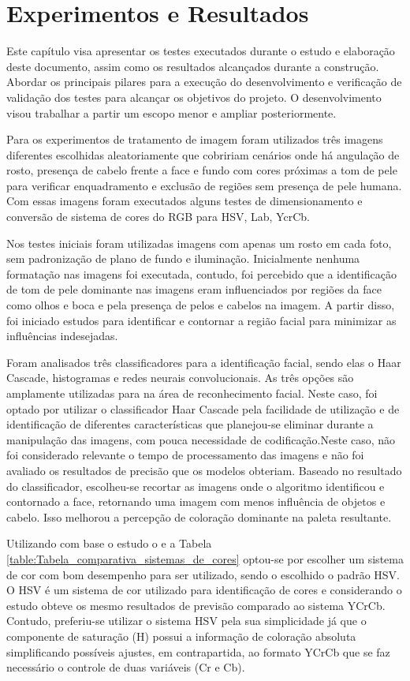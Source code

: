 \chapter{Experimentos e Resultados}
\label{cap:experimentos-resultados}
Este capítulo visa apresentar os testes executados durante o estudo e elaboração deste documento, assim como os resultados alcançados durante a construção. Abordar os principais pilares para a execução  do desenvolvimento e verificação de validação dos testes para alcançar os objetivos do projeto. O desenvolvimento visou trabalhar a partir um escopo menor e ampliar posteriormente.

Para os experimentos de tratamento de imagem foram utilizados três imagens diferentes escolhidas aleatoriamente que cobririam cenários onde há angulação de rosto, presença de cabelo frente a face e fundo com cores próximas a tom de pele para verificar enquadramento e exclusão de regiões sem presença de pele humana. Com essas imagens foram executados alguns testes de dimensionamento e conversão de sistema de cores do RGB para HSV, Lab, YcrCb.

Nos testes iniciais foram utilizadas imagens com apenas um rosto em cada foto, sem padronização de plano de fundo e iluminação. Inicialmente nenhuma formatação nas imagens foi executada, contudo, foi percebido que a identificação de tom de pele dominante nas imagens eram influenciados por regiões da face como olhos e boca e pela presença de pelos e cabelos na imagem. A partir disso, foi iniciado estudos para identificar e contornar a região facial para minimizar as influências indesejadas. 

Foram analisados três classificadores para a identificação facial, sendo elas o Haar Cascade, histogramas e redes neurais convolucionais. As três opções são amplamente utilizadas para na área de reconhecimento facial. Neste caso, foi optado por utilizar o classificador Haar Cascade pela facilidade de utilização e de identificação de diferentes características que planejou-se eliminar durante a manipulação das imagens, com pouca necessidade de codificação.Neste caso, não foi considerado relevante o tempo de processamento das imagens e não foi avaliado os resultados de precisão que os modelos obteriam. Baseado no resultado do classificador, escolheu-se recortar as imagens onde o algoritmo identificou e contornado a face, retornando uma imagem com menos influência de objetos e cabelo. Isso melhorou a percepção de coloração dominante na paleta resultante.

Utilizando com base o estudo o \cite{Automatic_Skin_Tone_Extraction_for_Visagism_Applications} e a Tabela \ref{table:Tabela_comparativa_sistemas_de_cores} optou-se por escolher um sistema de cor com bom desempenho para ser utilizado, sendo o escolhido o padrão HSV. O HSV é um sistema de cor utilizado para identificação de cores e considerando o estudo obteve os mesmo resultados de previsão comparado ao sistema YCrCb. Contudo, preferiu-se utilizar o sistema HSV pela sua simplicidade já que o componente de saturação (H) possui a informação de coloração absoluta simplificando possíveis ajustes, em contrapartida, ao formato YCrCb que se faz necessário o controle de duas variáveis (Cr e Cb).

